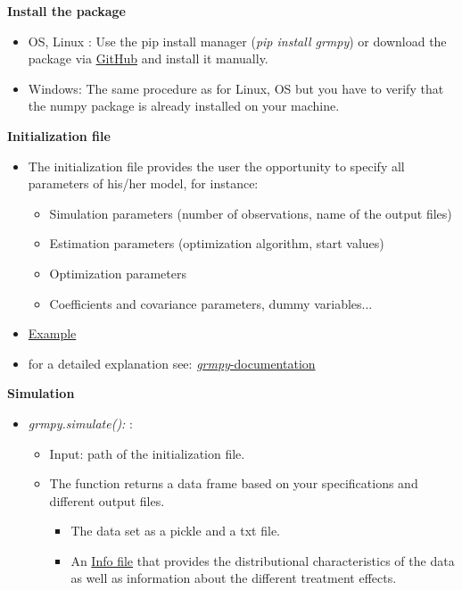 \begin{frame}
\textbf{Install the package}
\begin{itemize}\setlength\itemsep{1em}
\item OS, Linux : Use the pip install manager (\textit{pip install grmpy}) or download the package via \href{https://github.com/grmToolbox/grmpy}{GitHub} and install it manually.
\item Windows:  The same procedure as for Linux, OS but you have to verify that the numpy package is already installed on your machine.
\end{itemize}
\end{frame}

\begin{frame}
\textbf{Initialization file}
\begin{itemize}\setlength\itemsep{1em}
\item The initialization file provides the user the opportunity to specify all parameters of his/her model, for instance:\medskip
  \begin{itemize}\setlength\itemsep{1em}
  \item Simulation parameters (number of observations, name of the output files)
  \item Estimation parameters (optimization algorithm, start values)
  \item Optimization parameters
  \item Coefficients and covariance parameters, dummy variables...
  \end{itemize}
\item \href{../material/05_grmpy_tutorial/application/tutorial.grmpy.ini}{Example}
\item for a detailed explanation see: \href{http://grmpy.readthedocs.io/en/latest/tutorial.html}{\textit{grmpy}-documentation}
\end{itemize}
\end{frame}

\begin{frame}
\textbf{Simulation}
\begin{itemize}\setlength\itemsep{1em}
\item \textit{grmpy.simulate():} :\medskip
\begin{itemize}\setlength\itemsep{1em}
\item Input: path of the initialization file.
\item The function returns a data frame based on your specifications and different output files.
\begin{itemize}\setlength\itemsep{1em}
\item The data set as a pickle and a txt file.
\item An \href{../material/05_grmpy_tutorial/examples/data.grmpy.info}{Info file} that provides the distributional characteristics of the data as well as information about the different treatment effects.
\end{itemize}

\end{itemize}
\end{itemize}
\end{frame}

